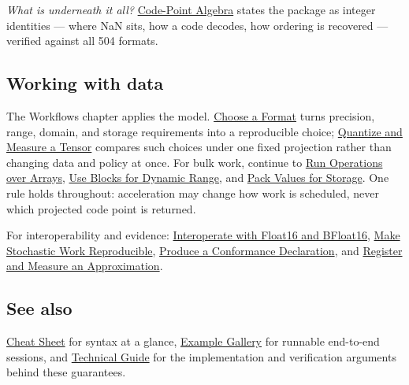 \emph{What is underneath it all?} \href{concept\_\allowbreak{}codepoint\_\allowbreak{}algebra.md}{Code-Point Algebra} states the package as integer identities — where NaN sits, how a code decodes, how ordering is recovered — verified against all 504 formats.



\subsection{Working with data}



\label{9020077469448938801}{}


The Workflows chapter applies the model. \href{workflow\_\allowbreak{}choose\_\allowbreak{}format.md}{Choose a Format} turns precision, range, domain, and storage requirements into a reproducible choice; \href{workflow\_\allowbreak{}quantize\_\allowbreak{}measure.md}{Quantize and Measure a Tensor} compares such choices under one fixed projection rather than changing data and policy at once. For bulk work, continue to \href{workflow\_\allowbreak{}arrays.md}{Run Operations over Arrays}, \href{workflow\_\allowbreak{}blocks.md}{Use Blocks for Dynamic Range}, and \href{workflow\_\allowbreak{}packed\_\allowbreak{}storage.md}{Pack Values for Storage}. One rule holds throughout: acceleration may change how work is scheduled, never which projected code point is returned.



For interoperability and evidence: \href{workflow\_\allowbreak{}float16.md}{Interoperate with Float16 and BFloat16}, \href{workflow\_\allowbreak{}stochastic.md}{Make Stochastic Work Reproducible}, \href{workflow\_\allowbreak{}conformance.md}{Produce a Conformance Declaration}, and \href{workflow\_\allowbreak{}approximation.md}{Register and Measure an Approximation}.



\subsection{See also}



\label{292862844209942199-dup1}{}


\href{help\_\allowbreak{}cheat\_\allowbreak{}sheet.md}{Cheat Sheet} for syntax at a glance, \href{examples\_\allowbreak{}gallery.md}{Example Gallery} for runnable end-to-end sessions, and \href{technical\_\allowbreak{}guide.md}{Technical Guide} for the implementation and verification arguments behind these guarantees.




